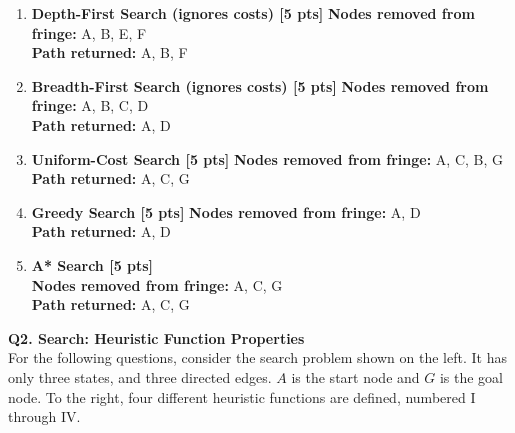 \begin{enumerate}
\item {\bf Depth-First Search (ignores costs) [5 pts]}
\vfill
  \textbf{Nodes removed from fringe:} {\color{red} A, B, E, F} \\
  \textbf{Path returned:} {\color{red} A, B, F} \\
\item {\bf Breadth-First Search (ignores costs) [5 pts]}
\vfill
  \textbf{Nodes removed from fringe: } {\color{red}  A, B, C, D}\\
  \textbf{Path returned: }  {\color{red} A, D}\\
\item {\bf Uniform-Cost Search [5 pts]}
\vfill
  \textbf{Nodes removed from fringe: } {\color{red} A, C, B, G}\\
  \textbf{Path returned: }  {\color{red}  A, C, G}\\
\item {\bf Greedy Search [5 pts]} 
\vfill
  \textbf{Nodes removed from fringe: } {\color{red}  A, D}\\
  \textbf{Path returned: }  {\color{red}  A, D}\\
\item {\bf A* Search [5 pts]} \\
  \textbf{Nodes removed from fringe: } {\color{red} A, C, G}\\
  \textbf{Path returned: } {\color{red} A, C, G} \\
\end{enumerate}	



\newpage

\textbf{Q2. Search: Heuristic Function Properties} \\

For the following questions, consider the search problem shown on the left.
It has only three states, and three directed edges.
$A$ is the start node and $G$ is the goal node.
To the right, four different heuristic functions are defined, numbered I through IV.

